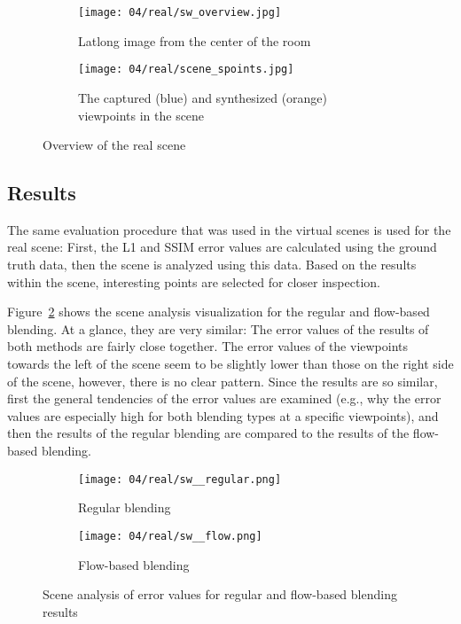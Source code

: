 \begin{figure}
\centering
    \hfill
    \begin{subfigure}[c]{0.65\textwidth}
            \centering
            \texttt{[image: 04/real/sw\_overview.jpg]}
            \caption{Latlong image from the center of the room}
    \end{subfigure}
    \hfill
    \begin{subfigure}[c]{0.33\textwidth}
            \centering
            \texttt{[image: 04/real/scene\_spoints.jpg]}
            \caption{The captured (blue) and synthesized (orange) viewpoints in the scene}
    \end{subfigure}
    \hfill
  \caption{Overview of the real scene}
  \label{fig:real_setup}
\end{figure}


\subsection{Results}
The same evaluation procedure that was used in the virtual scenes is used for the real scene: First, the L1 and SSIM error values are calculated using the ground truth data, then the scene is analyzed using this data. Based on the results within the scene, interesting points are selected for closer inspection.

Figure~\ref{fig:real_scene_analysis} shows the scene analysis visualization for the regular and flow-based blending. At a glance, they are very similar: The error values of the results of both methods are fairly close together. The error values of the viewpoints towards the left of the scene seem to be slightly lower than those on the right side of the scene, however, there is no clear pattern. Since the results are so similar, first the general tendencies of the error values are examined (e.g., why the error values are especially high for both blending types at a specific viewpoints), and then the results of the regular blending are compared to the results of the flow-based blending.

\begin{figure}
\centering
    \hfill
    \begin{subfigure}[b]{0.45\textwidth}
            \centering
            \texttt{[image: 04/real/sw\_\_regular.png]}
            \caption{Regular blending}
    \end{subfigure}
    \hfill
    \begin{subfigure}[b]{0.45\textwidth}
            \centering
            \texttt{[image: 04/real/sw\_\_flow.png]}
            \caption{Flow-based blending}
    \end{subfigure}
    \hfill
  \caption{Scene analysis of error values for regular and flow-based blending results}
  \label{fig:real_scene_analysis}
\end{figure}



